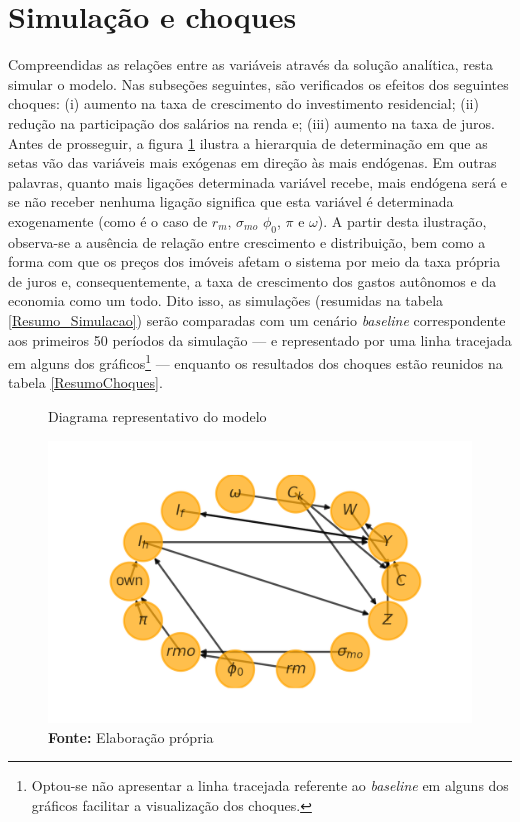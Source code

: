 \section{Simulação e choques}
\label{SecChoques}

Compreendidas as relações entre as variáveis através da solução analítica, resta simular o modelo. Nas subseções seguintes, são verificados os efeitos dos seguintes choques:
(i) aumento na taxa de crescimento do investimento residencial; (ii) redução na participação dos salários na renda e;  (iii) aumento na taxa de juros. Antes de prosseguir, a figura \ref{dag} ilustra a hierarquia de determinação em que as setas vão das variáveis mais exógenas em direção às mais endógenas. Em outras palavras, quanto mais ligações determinada variável recebe, mais endógena será e se não receber nenhuma ligação significa que esta variável é determinada exogenamente (como é o caso de $r_m$, $\sigma_{mo}$ $\phi_0$, $\pi$ e $\omega$).
A partir desta ilustração, observa-se a ausência de relação entre crescimento e distribuição, bem como a forma com que os preços dos imóveis afetam o sistema por meio da taxa própria de juros e, consequentemente, a taxa de crescimento dos gastos autônomos e da economia como um todo. 
Dito isso, as simulações (resumidas na tabela \ref{Resumo_Simulacao}) serão comparadas com um cenário \textit{baseline}
correspondente aos primeiros 50 períodos da simulação --- e representado por uma linha tracejada em alguns dos gráficos\footnote{
	Optou-se não apresentar a linha tracejada referente ao \textit{baseline} em alguns dos gráficos facilitar a visualização dos choques.}
 --- enquanto os resultados dos choques estão reunidos na tabela \ref{ResumoChoques}.

\begin{figure}[H]
	\centering
	\caption{Diagrama representativo do modelo}
		\label{dag}
	\includegraphics[width=\textwidth]{../../Modelo/Versoes/Dag.png}
	\caption*{\textbf{Fonte:} Elaboração própria}
\end{figure}



